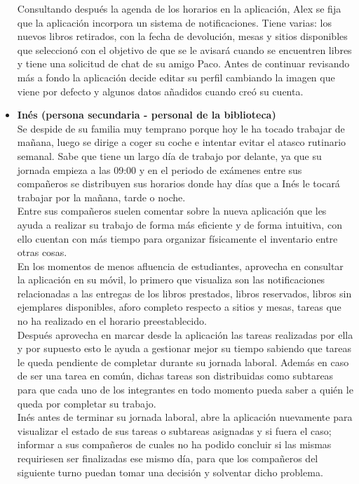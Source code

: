 \documentclass[12pt]{article}
\begin{document}
\begin{itemize}[noitemsep]
Consultando después la agenda de los horarios en la aplicación, Alex se fija que la aplicación incorpora un sistema de notificaciones. Tiene varias: los nuevos libros retirados, con la fecha de devolución, mesas y sitios disponibles que seleccionó con el objetivo de que se le avisará cuando se encuentren libres y tiene una solicitud de chat de su amigo Paco. Antes de continuar revisando más a fondo la aplicación decide editar su perfil cambiando la imagen que viene por defecto y algunos datos añadidos cuando creó su cuenta.\\

\item \textbf{Inés (persona secundaria - personal de la biblioteca)} \\
Se despide de su familia muy temprano porque hoy le ha tocado trabajar de mañana, luego se dirige a coger su coche e intentar evitar el atasco rutinario semanal. Sabe que tiene un largo día de trabajo por delante, ya que su jornada empieza a las 09:00 y en el periodo de exámenes entre sus compañeros se distribuyen sus horarios donde hay días que a Inés le tocará trabajar por la mañana, tarde o noche.\\

Entre sus compañeros suelen comentar sobre la nueva aplicación que les ayuda a realizar su trabajo de forma más eficiente y de forma intuitiva, con ello cuentan con más tiempo para organizar físicamente el inventario entre otras cosas.\\

En los momentos de menos afluencia de estudiantes, aprovecha en consultar la aplicación en su móvil, lo primero que visualiza son las notificaciones relacionadas a las entregas de los libros prestados, libros reservados, libros sin ejemplares disponibles, aforo completo respecto a sitios y mesas, tareas que no ha realizado en el horario preestablecido.\\

Después aprovecha en marcar desde la aplicación las tareas realizadas por ella y por supuesto esto le ayuda a gestionar mejor su tiempo sabiendo que tareas le queda pendiente de completar durante su jornada laboral. Además en caso de ser una tarea en común, dichas tareas son distribuidas como subtareas para que cada uno de los integrantes en todo momento pueda saber a quién le queda por completar su trabajo.\\
	
Inés antes de terminar su jornada laboral, abre la aplicación nuevamente para visualizar el estado de sus tareas o subtareas asignadas y si fuera el caso; informar a sus compañeros de cuales no ha podido concluir si las mismas requiriesen ser finalizadas ese mismo día, para que los compañeros del siguiente turno puedan tomar una decisión y solventar dicho problema.\\

\end{itemize}
\end{document}
